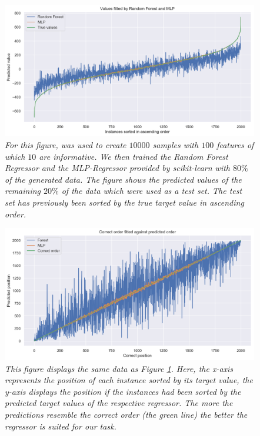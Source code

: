 	\begin{figure}[h]
		\centering
		\includegraphics[width=\linewidth]{images/mlp_forest_comparison01.png}
		\caption{\textit{For this figure, {\normalfont {}} was used to create $10000$ samples with $100$ features of which $10$ are informative. We then trained the Random Forest Regressor and the MLP-Regressor provided by {\normalfont scikit-learn} with $80\%$ of the generated data. The figure shows the predicted values of the remaining $20\%$ of the data which were used as a test set. The test set has previously been sorted by the true target value in ascending order.}}
		\label{forest_mlp_comp1}
	\end{figure}
	\begin{figure}[h]
		\centering
		\includegraphics[width=\linewidth]{images/mlp_forest_comparison02.png}
		\caption{\textit{This figure displays the same data as Figure \ref{forest_mlp_comp1}. Here, the x-axis represents the position of each instance sorted by its target value, the y-axis displays the position if the instances had been sorted by the predicted target values of the respective regressor. The more the predictions resemble the correct order (the green line) the better the regressor is suited for our task.}}
		\label{forest_mlp_comp2}
	\end{figure}


